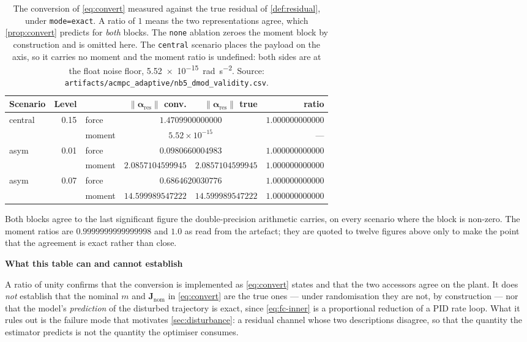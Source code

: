 \documentclass[11pt,a4paper,twoside,openright]{report}
\renewcommand{\vec}[1]{\bm{#1}}
\newcommand{\mat}[1]{\bm{#1}}
\theoremstyle{plain}
\theoremstyle{definition}
\theoremstyle{remark}
\newcommand{\keyhead}[1]{\textbf{\sffamily\small\textcolor{NavyDeep}{#1}}\par\vspace{2pt}}
\begin{document}
	\begin{table}[htbp]
		\centering
		\caption{The conversion of \cref{eq:convert} measured against the true
			residual of \cref{def:residual}, under \texttt{mode=exact}. A ratio of $1$
			means the two representations agree, which \cref{prop:convert} predicts
			for \emph{both} blocks. The \texttt{none} ablation zeroes the moment block
			by construction and is omitted here. The \texttt{central} scenario places
			the payload on the axis, so it carries no moment and the moment ratio is
			undefined: both sides are at the float noise floor,
			\SI{5.52e-15}{\radian\per\square\second}. Source:
			\texttt{artifacts/acmpc\_adaptive/nb5\_dmod\_validity.csv}.}
		\label{tab:res-dmod}
		\small
		\begin{tabularx}{\linewidth}{@{}l r X r r r@{}}
			\toprule
			\textbf{Scenario} & \textbf{Level} & & $\|\vec\alpha_\mathrm{res}\|$ conv. & $\|\vec\alpha_\mathrm{res}\|$ true & \textbf{ratio} \\
			\midrule
			central & 0.15 & force  & \multicolumn{2}{c}{$1.4709900000000$} & $1.000000000000$ \\
			        &      & moment & \multicolumn{2}{c}{$5.52\times10^{-15}$} & --- \\
			\addlinespace[2pt]
			asym    & 0.01 & force  & \multicolumn{2}{c}{$0.0980660004983$} & $1.000000000000$ \\
			        &      & moment & $2.0857104599945$ & $2.0857104599945$ & $1.000000000000$ \\
			\addlinespace[2pt]
			asym    & 0.07 & force  & \multicolumn{2}{c}{$0.6864620030776$} & $1.000000000000$ \\
			        &      & moment & $14.599989547222$ & $14.599989547222$ & $1.000000000000$ \\
			\bottomrule
		\end{tabularx}
	\end{table}

	Both blocks agree to the last significant figure the double-precision
	arithmetic carries, on every scenario where the block is non-zero. The
	moment ratios are $0.9999999999999998$ and $1.0$ as read from the artefact;
	they are quoted to twelve figures above only to make the point that the
	agreement is exact rather than close.

	\begin{keybox}
		\keyhead{What this table can and cannot establish}
		A ratio of unity confirms that the conversion is implemented as
		\cref{eq:convert} states and that the two accessors agree on the plant. It
		does \emph{not} establish that the nominal $m$ and $\mat J_\mathrm{nom}$ in
		\cref{eq:convert} are the true ones --- under randomisation they are not, by
		construction --- nor that the model's \emph{prediction} of the disturbed
		trajectory is exact, since \cref{eq:fc-inner} is a proportional reduction of a
		PID rate loop. What it rules out is the failure mode that motivates
		\cref{sec:disturbance}: a residual channel whose two descriptions disagree, so
		that the quantity the estimator predicts is not the quantity the optimiser
		consumes.
	\end{keybox}
\end{document}
